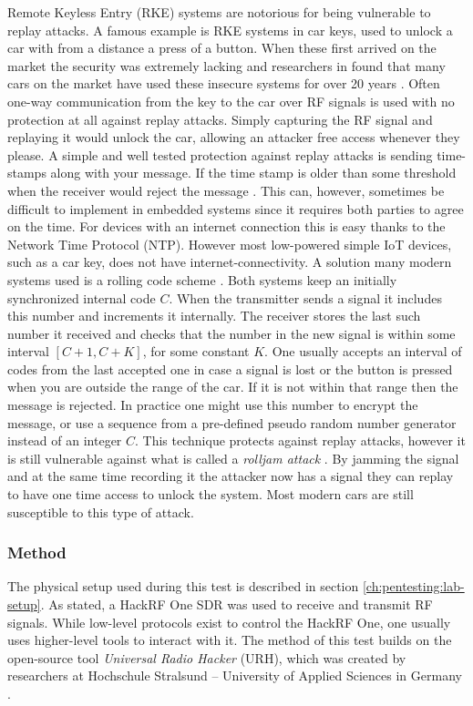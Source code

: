 Remote Keyless Entry (RKE) systems are notorious for being vulnerable to replay attacks. A famous example is RKE systems in car keys, used to unlock a car with from a distance a press of a button. When these first arrived on the market the security was extremely lacking and researchers in \citeyear{car-rke-systems} found that many cars on the market have used these insecure systems for over 20 years \cite{car-rke-systems}. Often one-way communication from the key to the car over RF signals is used with no protection at all against replay attacks. Simply capturing the RF signal and replaying it would unlock the car, allowing an attacker free access whenever they  please. A simple and well tested protection against replay attacks is sending time-stamps along with your message. If the time stamp is older than some threshold when the receiver would reject the message \cite{rke-replay}. This can, however, sometimes be difficult to implement in embedded systems since it requires both parties to agree on the time. For devices with an internet connection this is easy thanks to the Network Time Protocol (NTP). However most low-powered simple IoT devices, such as a car key, does not have internet-connectivity. A solution many modern systems used is a rolling code scheme \cite{hacking-the-iot-talk}\cite{kamkar2015drive}. Both systems keep an initially synchronized internal code $C$. When the transmitter sends a signal it includes this number and increments it internally. The receiver stores the last such number it received and checks that the number in the new signal is within some interval $[C+1, C+K]$, for some constant $K$. One usually accepts an interval of codes from the last accepted one in case a signal is lost or the button is pressed when you are outside the range of the car. If it is not within that range then the message is rejected. In practice one might use this number to encrypt the message, or use a sequence from a pre-defined pseudo random number generator instead of an integer $C$. This technique protects against replay attacks, however it is still vulnerable against what is called a \textit{rolljam attack} \cite{kamkar2015drive}. By jamming the signal and at the same time recording it the attacker now has a signal they can replay to have one time access to unlock the system. Most modern cars are still susceptible to this type of attack.

\subsubsection{Method} \label{ch:pentesting:replay:method}
The physical setup used during this test is described in section \ref{ch:pentesting:lab-setup}. As stated, a HackRF One SDR was used to receive and transmit RF signals. While low-level protocols exist to control the HackRF One, one usually uses higher-level tools to interact with it. The method of this test builds on the open-source tool \textit{Universal Radio Hacker} (URH), which was created by researchers at Hochschule Stralsund – University of Applied Sciences in Germany \cite{urh}.

